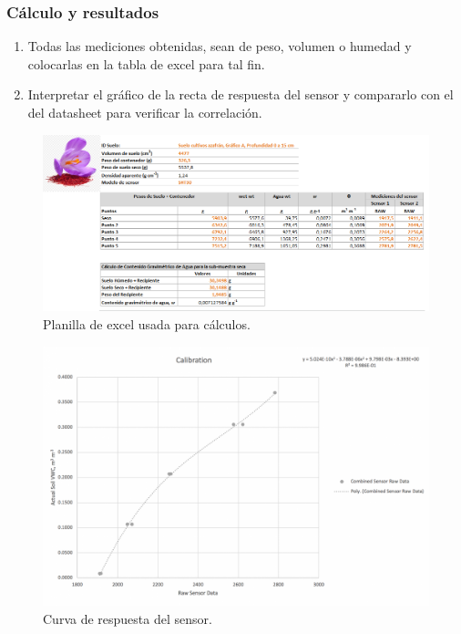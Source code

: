 \subsubsection{Cálculo y resultados}

\begin{enumerate}

    \item Todas las mediciones obtenidas, sean de peso, volumen o humedad y colocarlas en la tabla de excel para tal fin.
    \item Interpretar el gráfico de la recta de respuesta del sensor y compararlo con el del datasheet para verificar la correlación.
   
\end{enumerate}

\begin{figure}[H]
    \centering
    \includegraphics[width=\textwidth]{imagenes/imagenes calibracion/planilla.PNG}
    \caption{Planilla de excel usada para cálculos.}
    \label{fig:planilla}
\end{figure}

\begin{figure}[H]
    \centering
    \includegraphics[width=\textwidth]{imagenes/imagenes calibracion/respuesta.png}
    \caption{Curva de respuesta del sensor.}
    \label{fig:respuesta}
\end{figure}



